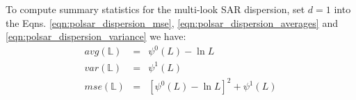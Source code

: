 %

To compute summary statistics for the multi-look SAR dispersion,
  set $d=1$ into the Eqns. \ref{eqn:polsar_dispersion_mse}, \ref{eqn:polsar_dispersion_averages} and \ref{eqn:polsar_dispersion_variance}
we have:
  \begin{eqnarray*}
    avg(\mathbb{L}) &=& \psi^0(L) - \ln{L} \\
    var(\mathbb{L}) &=& \psi^1(L) \\
    mse(\mathbb{L}) &=& \left[ \psi^0(L) - \ln{L} \right]^2 + \psi^1(L)
\end{eqnarray*}

